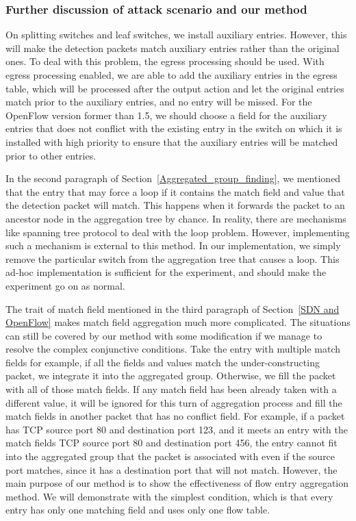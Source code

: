 \documentclass[conference]{IEEEtran}
\begin{document}
\subsubsection{Further discussion of attack scenario and our method}
\label{Further_discussion}
On splitting switches and leaf switches, we install auxiliary entries. However, this will make the detection packets match auxiliary entries rather than the original ones. To deal with this problem, the egress processing should be used. With egress processing enabled, we are able to add the auxiliary entries in the egress table, which will be processed after the output action and let the original entries match prior to the auxiliary entries, and no entry will be missed. For the OpenFlow version former than 1.5, we should choose a field for the auxiliary entries that does not conflict with the existing entry in the switch on which it is installed with high priority to ensure that the auxiliary entries will be matched prior to other entries.

In the second paragraph of Section~\ref{Aggregated_group_finding}, we mentioned that the entry that may force a loop if it contains the match field and value that the detection packet will match. This happens when it forwards the packet to an ancestor node in the aggregation tree by chance. In reality, there are mechanisms like spanning tree protocol to deal with the loop problem. However, implementing such a mechanism is external to this method. In our implementation, we simply remove the particular switch from the aggregation tree that causes a loop. This ad-hoc implementation is sufficient for the experiment, and should make the experiment go on as normal.

The trait of match field mentioned in the third paragraph of Section~\ref{SDN and OpenFlow} makes match field aggregation much more complicated. The situations can still be covered by our method with some modification if we manage to resolve the complex conjunctive conditions. Take the entry with multiple match fields for example, if all the fields and values match the under-constructing packet, we integrate it into the aggregated group. Otherwise, we fill the packet with all of those match fields. If any match field has been already taken with a different value, it will be ignored for this turn of aggregation process and fill the match fields in another packet that has no conflict field. For example, if a packet has TCP source port 80 and destination port 123, and it meets an entry with the match fields TCP source port 80 and destination port 456, the entry cannot fit into the aggregated group that the packet is associated with even if the source port matches, since it has a destination port that will not match. However, the main purpose of our method is to show the effectiveness of flow entry aggregation method. We will demonstrate with the simplest condition, which is that every entry has only one matching field and uses only one flow table.
\end{document}
